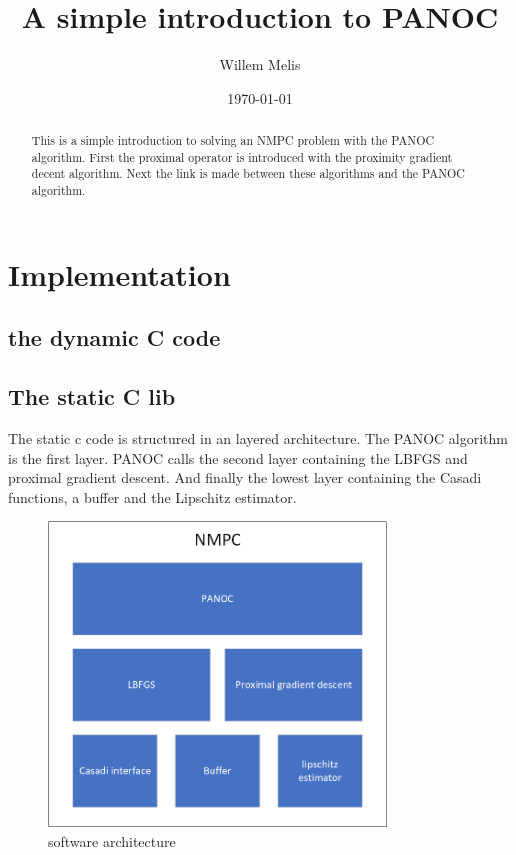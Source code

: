 \documentclass[]{article}
\title{A simple introduction to PANOC}
\author{Willem Melis}
\date{\today}
\begin{document}
\maketitle
\begin{abstract}
This is a simple introduction to solving an NMPC problem with the PANOC algorithm. First the proximal operator is introduced with the proximity gradient decent algorithm. Next the link is made between these algorithms and the PANOC algorithm.
\end{abstract}

\newpage
\tableofcontents 
\newpage



\clearpage


\clearpage

\section{Implementation}
	\subsection{the dynamic C code}
	\subsection{The static C lib}
		The static c code is structured in an layered architecture. The PANOC algorithm is the first layer. PANOC calls the second layer containing the LBFGS and proximal gradient descent. And finally the lowest layer containing the Casadi functions, a buffer and the Lipschitz estimator.
		\begin{figure}[H]
			\centering
			\label{fig:software architecture}
			\includegraphics[width=0.8\textwidth]{visio_software_arch}
			\caption{software architecture}
		\end{figure}
	
\clearpage
\appendix 


\newpage


\end{document}
